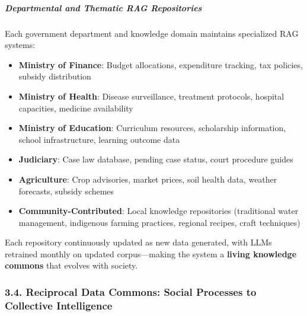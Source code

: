 \subparagraph{Departmental and Thematic RAG
Repositories}\label{departmental-and-thematic-rag-repositories}

Each government department and knowledge domain maintains specialized
RAG systems:

\begin{itemize}
\tightlist
\item
  \textbf{Ministry of Finance}: Budget allocations, expenditure
  tracking, tax policies, subsidy distribution
\item
  \textbf{Ministry of Health}: Disease surveillance, treatment
  protocols, hospital capacities, medicine availability
\item
  \textbf{Ministry of Education}: Curriculum resources, scholarship
  information, school infrastructure, learning outcome data
\item
  \textbf{Judiciary}: Case law database, pending case status, court
  procedure guides
\item
  \textbf{Agriculture}: Crop advisories, market prices, soil health
  data, weather forecasts, subsidy schemes
\item
  \textbf{Community-Contributed}: Local knowledge repositories
  (traditional water management, indigenous farming practices, regional
  recipes, craft techniques)
\end{itemize}

Each repository continuously updated as new data generated, with LLMs
retrained monthly on updated corpus---making the system a \textbf{living
knowledge commons} that evolves with society.

\subsubsection{3.4. Reciprocal Data Commons: Social Processes to
Collective
Intelligence}\label{reciprocal-data-commons-social-processes-to-collective-intelligence}

